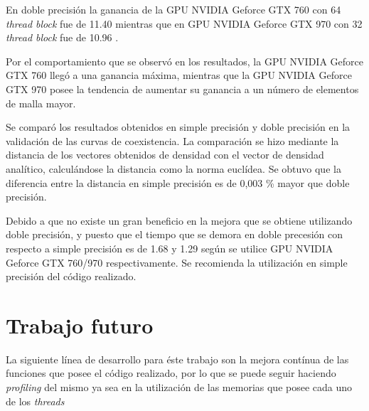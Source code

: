 En doble precisión la ganancia de la GPU NVIDIA Geforce GTX 760 con 64 \textit{thread block} fue de 11.40 mientras que en GPU NVIDIA Geforce GTX 970 con 32 \textit{thread block} fue de 10.96 .

Por el comportamiento que se observó en los resultados, la GPU NVIDIA Geforce GTX 760 llegó a una ganancia máxima, mientras que la GPU NVIDIA Geforce GTX 970 posee la tendencia de aumentar su ganancia a un número de elementos de malla mayor.

Se comparó los resultados obtenidos en simple precisión y doble precisión en la validación de las curvas de coexistencia. La comparación se hizo mediante la distancia de los vectores obtenidos de densidad con el vector de densidad analítico, calculándose la distancia como la norma euclídea. Se obtuvo que la diferencia entre la distancia en simple precisión es de 0,003 \% mayor que doble precisión.

Debido a que no existe un gran beneficio en la mejora que se obtiene utilizando doble precisión, y puesto que el tiempo que se demora en doble precesión con respecto a simple precisión es de 1.68 y 1.29 según se utilice GPU NVIDIA Geforce GTX 760/970 respectivamente. Se recomienda la utilización en simple precisión del código realizado.



\section{Trabajo futuro}

La siguiente línea de desarrollo para éste trabajo son la mejora contínua de las funciones que posee el código realizado, por lo que se puede seguir haciendo \textit{profiling} del mismo ya sea en la utilización de las memorias que posee cada uno de los \textit{threads} 